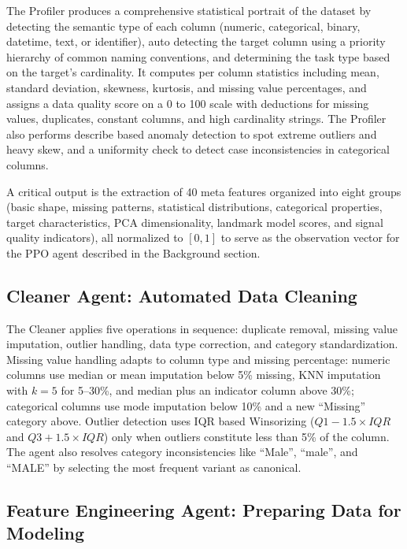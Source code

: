 \documentclass{article}
\begin{document}
The Profiler produces a comprehensive statistical portrait of the dataset by 
detecting the semantic type of each column (numeric, categorical, binary, 
datetime, text, or identifier), auto detecting the target column using a 
priority hierarchy of common naming conventions, and determining the task type 
based on the target's cardinality. It computes per column statistics including 
mean, standard deviation, skewness, kurtosis, and missing value percentages, 
and assigns a data quality score on a 0 to 100 scale with deductions for 
missing values, duplicates, constant columns, and high cardinality strings. 
The Profiler also performs describe based anomaly detection to spot extreme 
outliers and heavy skew, and a uniformity check to detect case inconsistencies 
in categorical columns.

A critical output is the extraction of 40 meta features organized into eight 
groups (basic shape, missing patterns, statistical distributions, categorical 
properties, target characteristics, PCA dimensionality, landmark model scores, 
and signal quality indicators), all normalized to $[0, 1]$ to serve as the 
observation vector for the PPO agent described in the Background section.

\subsection{Cleaner Agent: Automated Data Cleaning}

The Cleaner applies five operations in sequence: duplicate removal, missing
value imputation, outlier handling, data type correction, and category
standardization. Missing value handling adapts to column type and missing
percentage: numeric columns use median or mean imputation below 5\% missing,
KNN imputation with $k=5$ for 5--30\%, and median plus an indicator column
above 30\%; categorical columns use mode imputation below 10\% and a new
``Missing'' category above. Outlier detection uses IQR based Winsorizing
($Q1 - 1.5 \times IQR$ and $Q3 + 1.5 \times IQR$) only when outliers
constitute less than 5\% of the column. The agent also resolves category
inconsistencies like ``Male'', ``male'', and ``MALE'' by selecting the most
frequent variant as canonical.

\subsection{Feature Engineering Agent: Preparing Data for Modeling}
\end{document}
